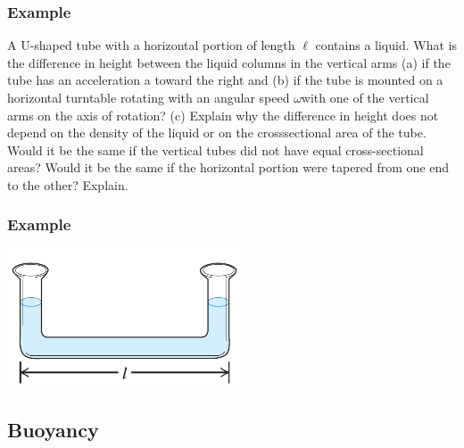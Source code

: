 \documentclass[]{beamer}
\begin{document}
  \begin{frame}
  \frametitle{Example \theexample}
  

  A U-shaped
  tube with a horizontal portion of
  length $\ell$ contains
  a liquid. What is the difference
  in height between the liquid
  columns in the vertical arms (a)
  if the tube has an acceleration a
  toward the right and (b) if the
  tube is mounted on a horizontal
  turntable rotating with an angular speed $\omega$with one of the vertical
  arms on the axis of rotation? (c) Explain why the difference in
  height does not depend on the density of the liquid or on the crosssectional
  area of the tube. Would it be the same if the vertical tubes
  did not have equal cross-sectional areas? Would it be the same if the
  horizontal portion were tapered from one end to the other? Explain.

  
 


    \end{frame}


    \begin{frame}
    \frametitle{Example \theexample}
    
  

    
    \begin{center}
      \includegraphics[height=1.6in]{images2/example_12.85.jpg}
    \end{center}
  
  
  
  
      \end{frame}

\subsection{Buoyancy}
\end{document}
